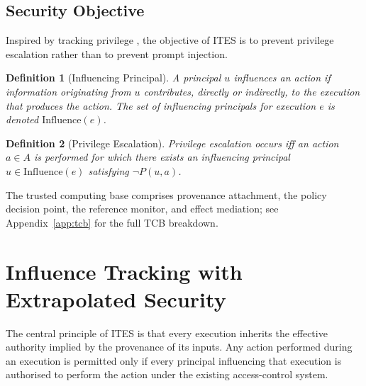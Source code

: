 \documentclass{article}
\newtheorem{definition}{Definition}
\begin{document}
\subsection{Security Objective}

Inspired by tracking privilege \citep{provos2003preventing,davi2010privilege},
the objective of ITES is to prevent privilege escalation rather than to prevent
prompt injection.

\begin{definition}[Influencing Principal]
\label{def:influence}
A principal $u$ influences an action if information originating from $u$
contributes, directly or indirectly, to the execution that produces the action.
The set of influencing principals for execution $e$ is denoted
$\mathrm{Influence}(e)$.
\end{definition}

\begin{definition}[Privilege Escalation]
\label{def:pe}
Privilege escalation occurs iff an action $a \in A$ is performed for which
there exists an influencing principal $u \in \mathrm{Influence}(e)$ satisfying
$\neg P(u,a)$.
\end{definition}

The trusted computing base comprises provenance attachment, the policy
decision point, the reference monitor, and effect mediation; see
Appendix~\ref{app:tcb} for the full TCB breakdown.

\section{Influence Tracking with Extrapolated Security}
\label{sec:ites}

The central principle of ITES is that every execution inherits the effective
authority implied by the provenance of its inputs. Any action performed during
an execution is permitted only if every principal influencing that execution is
authorised to perform the action under the existing access-control system.
\end{document}
